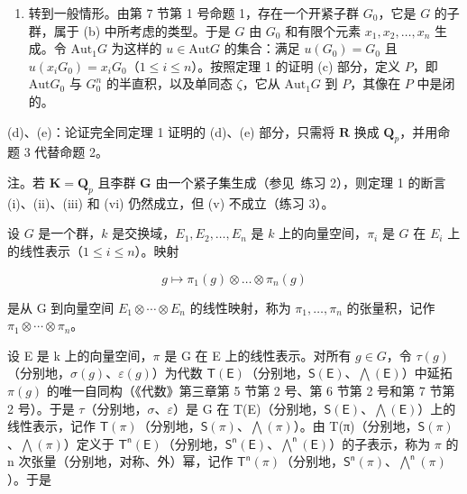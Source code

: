 \begin{enumerate}
\def\labelenumi{(\alph{enumi})}
\setcounter{enumi}{2}
\tightlist
\item
  转到一般情形。由第 7 节第 1 号命题 1，存在一个开紧子群 \(G_0\)，它是 \(G\) 的子群，属于 (b) 中所考虑的类型。于是 \(G\) 由 \(G_0\) 和有限个元素 \(x_1, x_2, \ldots, x_n\) 生成。令 \(\text{Aut}_1G\) 为这样的 \(u \in \text{Aut}G\) 的集合：满足 \(u(G_0) = G_0\) 且 \(u(x_iG_0) = x_iG_0\)（\(1 \leqslant i \leqslant n\)）。按照定理 1 的证明 (c) 部分，定义 \(P\)，即 \(\text{Aut}G_0\) 与 \(G_0^n\) 的半直积，以及单同态 \(\zeta\)，它从 \(\text{Aut}_1G\) 到 \(P\)，其像在 \(P\) 中是闭的。
\end{enumerate}

(d)、(e)：论证完全同定理 1 证明的 (d)、(e) 部分，只需将 \(\mathbf{R}\) 换成 \(\mathbf{Q}_p\)，并用命题 3 代替命题 2。

注。若 \(\mathbf{K} = \mathbf{Q}_p\) 且李群 \(\mathbf{G}\) 由一个紧子集生成（参见~练习 2），则定理 1 的断言 (i)、(ii)、(iii) 和 (vi) 仍然成立，但 (v) 不成立（练习 3）。



设 \(G\) 是一个群，\(k\) 是交换域，\(E_1, E_2, \ldots, E_n\) 是 \(k\) 上的向量空间，\(\pi_i\) 是 \(G\) 在 \(E_i\) 上的线性表示（\(1 \leqslant i \leqslant n\)）。映射

\[
g \mapsto \pi_ {1} (g) \otimes \dots \otimes \pi_ {n} (g)
\]

是从 G 到向量空间 \(E_{1} \otimes \cdots \otimes E_{n}\) 的线性映射，称为 \(\pi_{1}, \ldots, \pi_{n}\) 的张量积，记作 \(\pi_{1} \otimes \cdots \otimes \pi_{n}\)。

设 E 是 k 上的向量空间，\(\pi\) 是 G 在 E 上的线性表示。对所有 \(g \in G\)，令 \(\tau(g)\)（分别地，\(\sigma(g)\)、\(\varepsilon(g)\)）为代数 \(\mathsf{T}(\mathsf{E})\)（分别地，\(\mathsf{S}(\mathsf{E})\)、\(\bigwedge(\mathsf{E})\)）中延拓 \(\pi(g)\) 的唯一自同构（《代数》第三章第 5 节第 2 号、第 6 节第 2 号和第 7 节第 2 号）。于是 \(\tau\)（分别地，\(\sigma\)、\(\varepsilon\)）是 G 在 T(E)（分别地，\(\mathsf{S}(\mathsf{E})\)、\(\bigwedge(\mathsf{E})\)）上的线性表示，记作 \(\mathsf{T}(\pi)\)（分别地，\(\mathsf{S}(\pi)\)、\(\bigwedge(\pi)\)）。由 T(π)（分别地，\(\mathsf{S}(\pi)\)、\(\bigwedge(\pi)\)）定义于 \(\mathsf{T}^{\mathsf{n}}(\mathsf{E})\)（分别地，\(\mathsf{S}^{\mathsf{n}}(\mathsf{E})\)、\(\bigwedge^{\mathsf{n}}(\mathsf{E})\)）的子表示，称为 \(\pi\) 的 n 次张量（分别地，对称、外）幂，记作 \(\mathsf{T}^{\mathsf{n}}(\pi)\)（分别地，\(\mathsf{S}^{\mathsf{n}}(\pi)\)、\(\bigwedge^{\mathsf{n}}(\pi)\)）。于是


